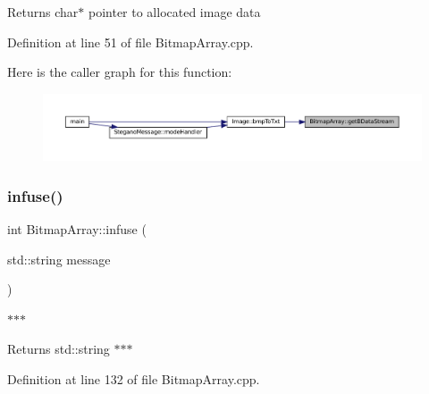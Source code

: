 \begin{DoxyReturn}{Returns}
char$\ast$ pointer to allocated image data 
\end{DoxyReturn}


Definition at line 51 of file Bitmap\+Array.\+cpp.

Here is the caller graph for this function\+:
\nopagebreak
\begin{figure}[H]
\begin{center}
\leavevmode
\includegraphics[width=350pt]{classBitmapArray_a7fe807ebdb5c41d3196440fab1ae3621_icgraph}
\end{center}
\end{figure}
\mbox{\label{classBitmapArray_afb549703b79c26499fc443f187bb3d6a}} 
\subsubsection{\texorpdfstring{infuse()}{infuse()}}
{\footnotesize\ttfamily int Bitmap\+Array\+::infuse (\begin{DoxyParamCaption}\item[{std\+::string}]{message }\end{DoxyParamCaption})}



$\ast$$\ast$$\ast$ 

\begin{DoxyReturn}{Returns}
std\+::string $\ast$$\ast$$\ast$ 
\end{DoxyReturn}


Definition at line 132 of file Bitmap\+Array.\+cpp.

